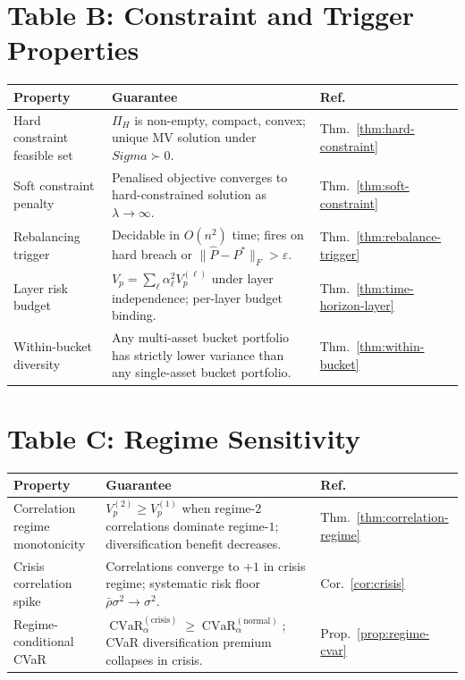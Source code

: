 \documentclass[12pt,openany]{book}
\newcommand{\bfSigma}{\boldsymbol{\Sigma}}
\DeclareMathOperator{\CVaR}{CVaR}
\numberwithin{equation}{chapter}
\theoremstyle{plain}
\theoremstyle{definition}
\theoremstyle{remark}
\def\bfSigma{Sigma}%
\begin{document}
\section*{Table B: Constraint and Trigger Properties}

\begin{center}
{\small
\begin{tabularx}{\textwidth}{@{} p{4.5cm} X p{3.8cm} @{}}
\hline
\textbf{Property} & \textbf{Guarantee} & \textbf{Ref.} \\
\hline
Hard constraint feasible set &
  $\Pi_H$ is non-empty, compact, convex;
  unique MV solution under $\bfSigma \succ 0$. &
  Thm.~\ref{thm:hard-constraint} \\
\addlinespace
Soft constraint penalty &
  Penalised objective converges to hard-constrained solution
  as $\lambda \to \infty$. &
  Thm.~\ref{thm:soft-constraint} \\
\addlinespace
Rebalancing trigger &
  Decidable in $O(n^2)$ time; fires on hard breach or
  $\|\hat{P} - P^*\|_F > \varepsilon$. &
  Thm.~\ref{thm:rebalance-trigger} \\
\addlinespace
Layer risk budget &
  $V_p = \sum_\ell \alpha_\ell^2 V_p^{(\ell)}$ under
  layer independence; per-layer budget binding. &
  Thm.~\ref{thm:time-horizon-layer} \\
\addlinespace
Within-bucket diversity &
  Any multi-asset bucket portfolio has strictly lower
  variance than any single-asset bucket portfolio. &
  Thm.~\ref{thm:within-bucket} \\
\hline
\end{tabularx}
}
\end{center}

\section*{Table C: Regime Sensitivity}

\begin{center}
{\small
\begin{tabularx}{\textwidth}{@{} p{5cm} X p{3.8cm} @{}}
\hline
\textbf{Property} & \textbf{Guarantee} & \textbf{Ref.} \\
\hline
Correlation regime monotonicity &
  $V_p^{(2)} \geq V_p^{(1)}$ when regime-$2$ correlations
  dominate regime-$1$; diversification benefit decreases. &
  Thm.~\ref{thm:correlation-regime} \\
\addlinespace
Crisis correlation spike &
  Correlations converge to $+1$ in crisis regime; systematic
  risk floor $\bar{\rho}\sigma^2 \to \sigma^2$. &
  Cor.~\ref{cor:crisis} \\
\addlinespace
Regime-conditional CVaR &
  $\CVaR_\alpha^{(\mathrm{crisis})} \geq
  \CVaR_\alpha^{(\mathrm{normal})}$;
  CVaR diversification premium collapses in crisis. &
  Prop.~\ref{prop:regime-cvar} \\
\hline
\end{tabularx}
}
\end{center}
\end{document}
